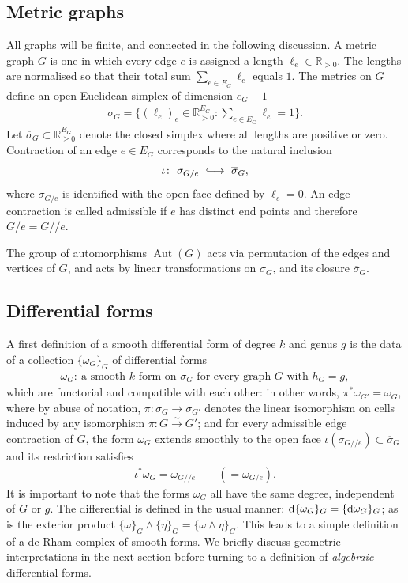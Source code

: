 \documentclass[pdftex]{sigma}%
\numberwithin{equation}{section}
\newcommand*{\Longhookrightarrow}{\ensuremath{\lhook\joinrel\relbar\joinrel\rightarrow}}
\newcommand{\R}{\mathbb R}
\newcommand{\q}{/\!/}
\newcommand{\0}{\color{blue}{\mathsf{0}}}
\begin{document}
\subsection{Metric graphs} \label{sect: MetricGraphs} All graphs will be finite, and connected in the following discussion. A metric graph $G$ is one in which every edge $e$ is assigned a length $\ell_e \in \R_{>0}$. The lengths are normalised so that their total sum $\sum_{e\in E_G} \ell_e $ equals $1$. The metrics on $G$ define an open Euclidean simplex of dimension $e_G-1$
\begin{gather*}
\sigma_G = \bigg\{(\ell_e)_e \in \R_{>0}^{E_G}\colon \sum_{e\in E_G} \ell_e=1\bigg\} .
\end{gather*}
 Let $\overline{\sigma}_G \subset \R_{\geq 0}^{E_G}$ denote the closed simplex where all lengths are positive or zero.
 Contraction of an edge $e \in E_G$ corresponds to the natural inclusion
 \begin{gather*}
 \iota\colon\ \sigma_{G/e} \ \Longhookrightarrow \ \overline{\sigma}_G,
 \end{gather*}
 where $\sigma_{G/ e}$ is identified with the open face defined by $\ell_e=0$.
 An edge contraction is called admissible if $e$ has distinct end points and therefore $G/e= G\q e$.

 The group of automorphisms $\operatorname{Aut}(G)$ acts via permutation of the edges and vertices of $G$, and acts by linear transformations on $\sigma_G$, and its closure $\overline{\sigma}_G$.

\subsection{Differential forms} A first definition of a smooth differential form of degree $k$ and genus $g$ is
 the data of a collection $\{\omega_G\}_G$ of differential forms
 \begin{gather*}
 \omega_G\colon\ \text{a smooth $k$-form on $\sigma_G$ for every graph $G$ with } h_G =g,
 \end{gather*}
 which are functorial and compatible with each other: in other words, $\pi^* \omega_{G'} = \omega_{G}$, where by abuse of notation, $\pi\colon \sigma_G \rightarrow \sigma_{G'}$ denotes the linear isomorphism on cells induced by any isomorphism $\pi\colon G \overset{\sim}{\rightarrow} G'$; and
 for every admissible edge contraction of $G$, the form $\omega_G$ extends smoothly to the open face $\iota (\sigma_{G/\!/ e}) \subset \overline{\sigma}_G$ and its restriction satisfies
 \begin{gather*}
 \iota^* \omega_G = \omega_{G/\!/ e} \qquad ( = \omega_{G/e}).
 \end{gather*}
 It is important to note that the forms $\omega_G$ all have the same degree, independent of $G$ or $g$.
 The differential is defined in the usual manner: ${\rm d} \{\omega_G\}_G = \{{\rm d} \omega_G\}_G$; as is the exterior product
 $\{\omega\}_G \wedge \{\eta\}_G = \{\omega \wedge \eta\}_G$.
 This leads to a simple definition of a de Rham complex of smooth forms. We briefly discuss geometric interpretations in the next section before turning to a definition of \emph{algebraic} differential forms.
\end{document}
